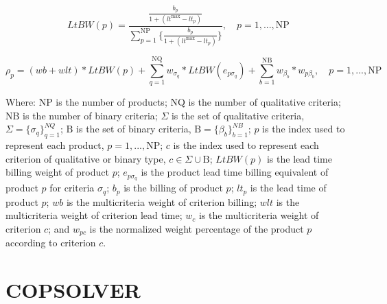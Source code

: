 \documentclass[10pt,fleqn,a4paper,twoside]{article}
\begin{document}
\begin{equation}
	\label{eq:leadTimeBillingWeight}
	LtBW(p) = \frac{\frac{b_p}{1 + (lt^{\max} - lt_p)}}{\sum_{p=1}^{\textrm{NP}}{ \{ \frac{b_p}{1 + (lt^{\max} - lt_p)} \} }}, \quad p= 1,...,\textrm{NP}
\end{equation}

\begin{equation}
	\label{eq:weight}
	\rho_{p} = (wb + wlt) * LtBW(p) + \sum_{q=1}^{\textrm{NQ}}{w_{\sigma_q}* LtBW(e_{p\sigma_q})} + \sum_{b=1}^{\textrm{NB}}{w_{\beta_b}*w_{p\beta_b}}, \quad p= 1,...,\textrm{NP}
\end{equation}

Where: $\textrm{NP}$ is the number of products; $\textrm{NQ}$ is the number of qualitative criteria; $\textrm{NB}$ is the number of binary criteria; $\Sigma$ is the set of qualitative criteria, $\Sigma = \{\sigma_q\}_{q=1}^{NQ}$; $\textrm{B}$ is the set of binary criteria, $\textrm{B} = \{\beta_b\}_{b=1}^{NB}$; $p$ is the index used to represent each product, $p= 1,...,\textrm{NP}$; $c$ is the index used to represent each criterion of qualitative or binary type, $c \in \Sigma \cup \textrm{B}$; $LtBW(p)$ is the lead time billing weight of product $p$; $e_{p\sigma_q}$ is the product lead time billing equivalent of product $p$ for criteria $\sigma_q$; $b_p$ is the billing of product $p$; $lt_p$ is the lead time of product $p$; $wb$ is the multicriteria weight of criterion billing; $wlt$ is the multicriteria weight of criterion lead time; $w_{c}$ is the multicriteria weight of criterion $c$; and $w_{pc}$ is the normalized weight percentage of the product $p$ according to criterion $c$.

	\section{COPSOLVER}
	
\end{document}

